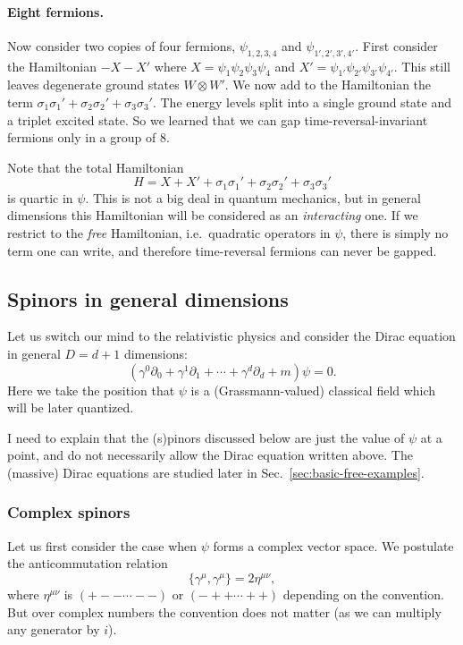 \documentclass[12pt]{article}
\numberwithin{equation}{section}
\numberwithin{figure}{section}
\theoremstyle{remark}
\begin{document}
\paragraph{Eight fermions.}
Now consider two copies of four fermions, $\psi_{1,2,3,4}$ and $\psi_{1',2',3',4'}$.
First consider the Hamiltonian $-X-X'$ where $X=\psi_1\psi_2\psi_3\psi_4$ and 
$X'=\psi_{1'} \psi_{2'}\psi_{3'}\psi_{4'}$.
This still leaves degenerate ground states $W\otimes W'$.
We now add to the Hamiltonian the term $\sigma_1 \sigma_1' +\sigma_2 \sigma_2'+\sigma_3 \sigma_3'$. 
The energy levels split into a single ground state and a triplet excited state.
So we learned that we can gap time-reversal-invariant fermions only in a group of 8.

Note that the total Hamiltonian  \begin{equation}
H=X+X'+\sigma_1 \sigma_1' +\sigma_2 \sigma_2'+\sigma_3 \sigma_3'
\end{equation} is quartic in $\psi$. 
This is not a big deal in quantum mechanics, but in general dimensions this Hamiltonian 
will be considered as an \emph{interacting} one.
If we restrict to the \emph{free} Hamiltonian, i.e.~quadratic operators in $\psi$,
there is simply no term one can write,
and therefore time-reversal fermions can never be gapped.


\subsection{Spinors in general dimensions}

Let us switch our mind to the relativistic physics and consider the Dirac equation 
in general $D=d+1$ dimensions: \begin{equation}
(\gamma^0\partial_0 + \gamma^1\partial_1+\cdots+\gamma^d\partial_d + m ) \psi=0.
\end{equation}
Here we take the position that $\psi$ is a (Grassmann-valued) classical field 
which will be later quantized.

{\color{red} I need to explain that the (s)pinors discussed below are 
just the value of $\psi$ at a point, and do not necessarily allow the Dirac equation
written above. The (massive) Dirac equations are studied later in Sec.~\ref{sec:basic-free-examples}.}

\subsubsection{Complex spinors}
Let us first consider the case when $\psi$ forms a complex vector space.
We postulate the anticommutation relation \begin{equation}
\{\gamma^\mu ,\gamma^\mu\} = 2\eta^{\mu\nu},
\end{equation} where $\eta^{\mu\nu}$ is $(+--\cdots--)$ or $(-++\cdots++)$ 
depending on the convention.
But over complex numbers the convention does not matter 
(as we can multiply any generator by $i$).
\end{document}
